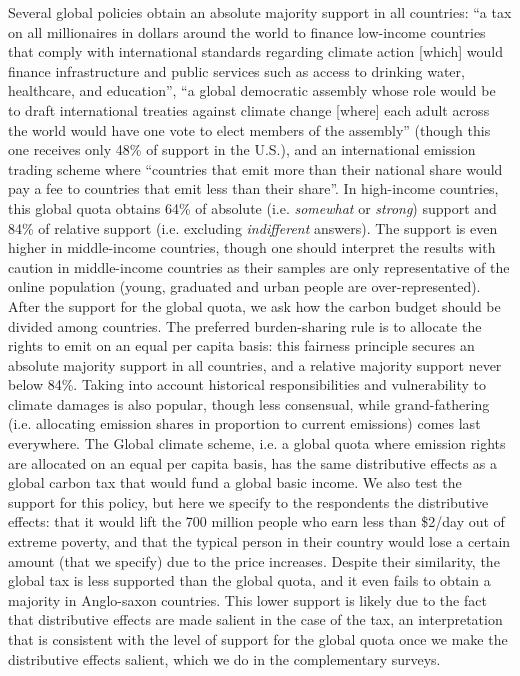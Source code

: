 \documentclass{nature}
\begin{document}
Several global policies obtain an absolute majority %
support in all countries: ``a tax on all millionaires in dollars around the world to finance low-income countries that comply with international standards regarding climate action [which] would finance infrastructure and public services such as access to drinking water, healthcare, and education'', ``a global democratic assembly whose role would be to draft international treaties against climate change [where] each adult across the world would have one vote to elect members of the assembly'' (though this one receives only 48\% of support in the U.S.), and an international emission trading scheme where ``countries that emit more than their national share would pay a fee to countries that emit less than their share''. 
In high-income countries, this global quota obtains 64\% of absolute (i.e. \textit{somewhat} or \textit{strong}) support and 84\% of relative support (i.e. excluding \textit{indifferent} answers). The support is even higher in middle-income countries, though one should interpret the results with caution in middle-income countries as their samples are only representative of the online population (young, graduated and urban people are over-represented). %
After the support for the global quota, we ask how the carbon budget should be divided among countries. 
The preferred burden-sharing rule is to allocate the rights to emit on an equal per capita basis: this fairness principle secures an absolute majority support in all countries, and a relative majority support never below 84\%. 
Taking into account historical responsibilities and vulnerability to climate damages is also popular, though less consensual, while grand-fathering (i.e. allocating emission shares in proportion to current emissions) comes last everywhere. 
The Global climate scheme, i.e. a global quota where emission rights are allocated on an equal per capita basis, has the same distributive effects as a global carbon tax that would fund a global basic income. We also test the support for this policy, but here we specify to the respondents the distributive effects: that it would lift the 700 million people who earn less than \$2/day out of extreme poverty, and that the typical person in their country would lose a certain amount (that we specify) due to the price increases.  %
Despite their similarity, the global tax is less supported than the global quota, and it even fails to obtain a majority in Anglo-saxon countries. This lower support is likely due to the fact that distributive effects are made salient in the case of the tax, an interpretation that is consistent with the level of support for the global quota once we make the distributive effects salient, which we do in the complementary surveys. %
\end{document}
